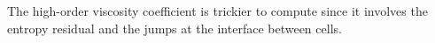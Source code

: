 The high-order viscosity coefficient is trickier to compute since it involves the entropy residual and the jumps at the interface between cells.   
